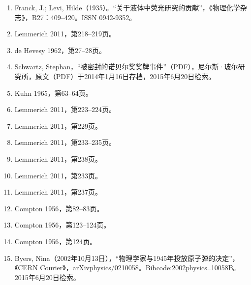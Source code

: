 \begin{enumerate}
\item Franck, J.; Levi, Hilde（1935）。“关于液体中荧光研究的贡献”，《物理化学杂志》，B27：409–420。ISSN 0942-9352。
\item Lemmerich 2011，第218–219页。
\item de Hevesy 1962，第27–28页。
\item Schwartz, Stephan，“被密封的诺贝尔奖奖牌事件”（PDF），尼尔斯·玻尔研究所，原文（PDF）于2014年1月16日存档，2015年6月20日检索。
\item Kuhn 1965，第63–64页。
\item Lemmerich 2011，第223–224页。
\item Lemmerich 2011，第229页。
\item Lemmerich 2011，第233–235页。
\item Lemmerich 2011，第238页。
\item Lemmerich 2011，第233页。
\item Lemmerich 2011，第237页。
\item Compton 1956，第82–83页。
\item Compton 1956，第123–124页。
\item Compton 1956，第124页。
\item Byers, Nina（2002年10月13日），“物理学家与1945年投放原子弹的决定”，《CERN Courier》，arXiv\:physics/0210058。Bibcode:2002physics..10058B。2015年6月20日检索。

\end{enumerate}
